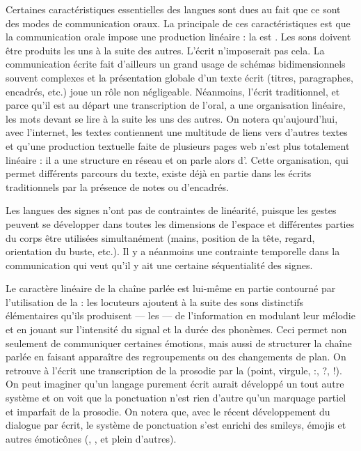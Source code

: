 Certaines caractéristiques essentielles des langues sont dues au fait que ce sont des modes de communication oraux. La principale de ces caractéristiques est que la communication orale impose une production linéaire : la  est . Les sons doivent être produits les uns à la suite des autres. L’écrit n’imposerait pas cela. La communication écrite fait d’ailleurs un grand usage de schémas bidimensionnels souvent complexes et la présentation globale d’un texte écrit (titres, paragraphes, encadrés, etc.) joue un rôle non négligeable. Néanmoins, l’écrit traditionnel, et parce qu’il est au départ une transcription de l’oral, a une organisation linéaire, les mots devant se lire à la suite les uns des autres. On notera qu’aujourd’hui, avec l’internet, les textes contiennent une multitude de liens vers d’autres textes et qu’une production textuelle faite de plusieurs pages web n’est plus totalement linéaire : il a une structure en réseau et on parle alors d’. Cette organisation, qui permet différents parcours du texte, existe déjà en partie dans les écrits traditionnels par la présence de notes ou d’encadrés.

Les langues des signes n’ont pas de contraintes de linéarité, puisque les gestes peuvent se développer dans toutes les dimensions de l’espace et différentes parties du corps être utilisées simultanément (mains, position de la tête, regard, orientation du buste, etc.). Il y a néanmoins une contrainte temporelle dans la communication qui veut qu’il y ait une certaine séquentialité des signes.

Le caractère linéaire de la chaîne parlée est lui-même en partie contourné par l’utilisation de la : les locuteurs ajoutent à la suite des sons distinctifs élémentaires qu’ils produisent — les  — de l’information en modulant leur mélodie et en jouant sur l’intensité du signal et la durée des phonèmes. Ceci permet non seulement de communiquer certaines émotions, mais aussi de structurer la chaîne parlée en faisant apparaître des regroupements ou des changements de plan. On retrouve à l’écrit une transcription de la prosodie par la  (point, virgule, :, ?, !).  On peut imaginer qu’un langage purement écrit aurait développé un tout autre système et on voit que la ponctuation n’est rien d’autre qu’un marquage partiel et imparfait de la prosodie. On notera que, avec le récent développement du dialogue par écrit, le système de ponctuation s’est enrichi des smileys, émojis et autres émoticônes (\HappySmiley{}, \SadSmiley{}, et plein d’autres).


